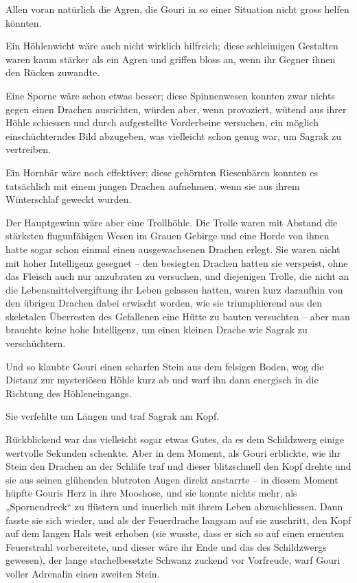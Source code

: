 \documentclass[10pt, a4paper, oneside]{book}
\begin{document}
Allen voran natürlich die Agren, die Gouri in so einer Situation nicht gross helfen könnten.

Ein Höhlenwicht wäre auch nicht wirklich hilfreich; diese schleimigen Gestalten waren kaum stärker als ein Agren und griffen bloss an, wenn ihr Gegner ihnen den Rücken zuwandte.

Eine Sporne wäre schon etwas besser; diese Spinnenwesen konnten zwar nichts gegen einen Drachen ausrichten, würden aber, wenn provoziert, wütend aus ihrer Höhle schiessen und durch aufgestellte Vorderbeine versuchen, ein möglich einschüchterndes Bild abzugeben, was vielleicht schon genug war, um Sagrak zu vertreiben.

Ein Hornbär wäre noch effektiver; diese gehörnten Riesenbären konnten es tatsächlich mit einem jungen Drachen aufnehmen, wenn sie aus ihrem Winterschlaf geweckt wurden.

Der Hauptgewinn wäre aber eine Trollhöhle. Die Trolle waren mit Abstand die stärksten flugunfähigen Wesen im Grauen Gebirge und eine Horde von ihnen hatte sogar schon einmal einen ausgewachsenen Drachen erlegt. Sie waren nicht mit hoher Intelligenz gesegnet – den besiegten Drachen hatten sie verspeist, ohne das Fleisch auch nur anzubraten zu versuchen, und diejenigen Trolle, die nicht an die Lebensmittelvergiftung ihr Leben gelassen hatten, waren kurz daraufhin von den übrigen Drachen dabei erwischt worden, wie sie triumphierend aus den skeletalen Überresten des Gefallenen eine Hütte zu bauten versuchten – aber man brauchte keine hohe Intelligenz, um einen kleinen Drache wie Sagrak zu verschüchtern.

Und so klaubte Gouri einen scharfen Stein aus dem felsigen Boden, wog die Distanz zur mysteriösen Höhle kurz ab und warf ihn dann energisch in die Richtung des Höhleneingangs.

Sie verfehlte um Längen und traf Sagrak am Kopf.

Rückblickend war das vielleicht sogar etwas Gutes, da es dem Schildzwerg einige wertvolle Sekunden schenkte. Aber in dem Moment, als Gouri erblickte, wie ihr Stein den Drachen an der Schläfe traf und dieser blitzschnell den Kopf drehte und sie aus seinen glühenden blutroten Augen direkt anstarrte – in diesem Moment hüpfte Gouris Herz in ihre Mooshose, und sie konnte nichts mehr, als „Spornendreck“ zu flüstern und innerlich mit ihrem Leben abzuschliessen. Dann fasste sie sich wieder, und als der Feuerdrache langsam auf sie zuschritt, den Kopf auf dem langen Hals weit erhoben (sie wusste, dass er sich so auf einen erneuten Feuerstrahl vorbereitete, und dieser wäre ihr Ende und das des Schildzwergs gewesen), der lange stachelbesetzte Schwanz zuckend vor Vorfreude, warf Gouri voller Adrenalin einen zweiten Stein.
\end{document}
